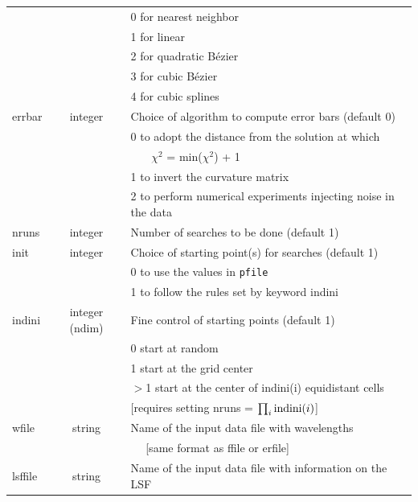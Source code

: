 \documentclass[12pt]{article}
\begin{document}
\begin{table}
\begin{tabular}{lcl}
	&                      &   0 for nearest neighbor \\
	&                      &   1 for linear  \\
	&                      &   2 for quadratic B\'ezier \\	
	&                      &   3 for cubic B\'ezier \\	
	&                      &   4 for cubic splines  \\	
errbar    &    integer            & Choice of algorithm to compute error bars (default 0) \\
	&                      & 0 to adopt the distance from the solution at which \\
	&                      &  ~~~	$\chi^2$ = min($\chi^2$) + 1 \\
	&                      & 1 to invert the curvature matrix \\
	&                      & 2 to perform numerical experiments injecting noise in the data \\
nruns     &     integer           &  Number of searches to be done (default 1) \\	  
init      &   integer            & Choice of starting point(s) for searches (default 1) \\
	&                      &  0 to use the values in {\tt pfile} \\
	&                      &    1 to follow the rules set by keyword indini \\
indini    &  integer (ndim)      &  Fine control of starting points (default 1) \\
        &                      &  0 start at random \\
        &                      &    1 start at the grid center \\
        &                      &    $>$1 start at the center of indini(i) equidistant cells \\
        &                      &    [requires setting nruns = $\prod_i {\rm indini}(i)$] \\
wfile   &     string           & Name of the input data file with wavelengths \\
	&                      &   ~~ [same format as ffile or erfile] \\
lsffile &     string           & Name of the input data file with information on the LSF \\

\end{tabular}
\end{table}
\end{document}
